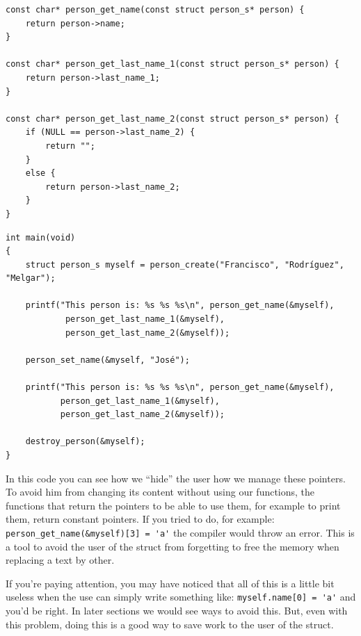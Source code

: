 \documentclass[a4paper]{article}
\begin{document}
\noindent
\begin{minipage}[H]{\linewidth}
\mbox{}
\begin{lstlisting}[style=C,
caption={Struct with const pointers -- Functions to retrieve information},
label={lst:structConstGetters}]
const char* person_get_name(const struct person_s* person) {
    return person->name;
}

const char* person_get_last_name_1(const struct person_s* person) {
    return person->last_name_1;
}

const char* person_get_last_name_2(const struct person_s* person) {
    if (NULL == person->last_name_2) {
        return "";
    }
    else {
        return person->last_name_2;
    }
}

\end{lstlisting}
\end{minipage}

\noindent
\begin{minipage}[H]{\linewidth}
\mbox{}
\begin{lstlisting}[style=C,
caption={Struct with const pointers -- \texttt{main} function},
label={lst:structConstMain}]
int main(void)
{
    struct person_s myself = person_create("Francisco", "Rodríguez", "Melgar");

    printf("This person is: %s %s %s\n", person_get_name(&myself),
            person_get_last_name_1(&myself),
            person_get_last_name_2(&myself));

    person_set_name(&myself, "José");

    printf("This person is: %s %s %s\n", person_get_name(&myself),
           person_get_last_name_1(&myself),
           person_get_last_name_2(&myself));

    destroy_person(&myself);
}
\end{lstlisting}
\end{minipage}

In this code you can see how we ``hide'' the user how we manage these pointers.
To avoid him from changing its content without using our functions, the functions
that return the pointers to be able to use them, for example to print them,
return constant pointers. If you tried to do, for example:
\lstinline[style=C]!person_get_name(&myself)[3] = 'a'! the compiler would throw
an error. This is a tool to avoid the user of the struct from forgetting to
free the memory when replacing a text by other.

If you're paying attention, you may have noticed that all of this is a little
bit useless when the use can simply write something like:
\verb!myself.name[0] = 'a'! and you'd be right. In later sections we would see
ways to avoid this. But, even with this problem, doing this is a good way to
save work to the user of the struct.
\end{document}
